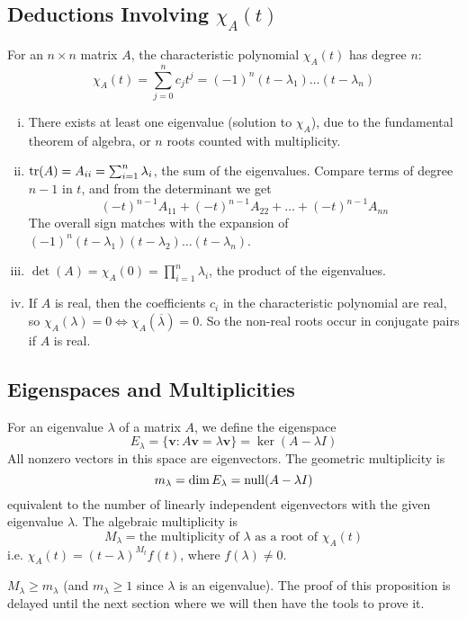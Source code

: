 \documentclass{article}
\begin{document}
\subsection{Deductions Involving $\chi_A(t)$}
For an $n \times n$ matrix $A$, the characteristic polynomial $\chi_A(t)$ has degree $n$:
\[ \chi_A(t) = \sum_{j = 0}^n c_j t^j = (-1)^n(t-\lambda_1)\dots(t-\lambda_n) \]
\begin{enumerate}[(i)]
	\item There exists at least one eigenvalue (solution to $\chi_A$), due to the fundamental theorem of algebra, or $n$ roots counted with multiplicity.
	\item $\tr(A) = A_{ii} = \sum_{i=1}^n \lambda_i$, the sum of the eigenvalues. Compare terms of degree $n-1$ in $t$, and from the determinant we get
	      \[ (-t)^{n-1}A_{11} + (-t)^{n-1}A_{22} + \dots + (-t)^{n-1}A_{nn} \]
	      The overall sign matches with the expansion of $(-1)^n(t-\lambda_1)(t-\lambda_2)\dots(t-\lambda_n)$.
	\item $\det(A) = \chi_A(0) = \prod_{i=1}^n \lambda_i$, the product of the eigenvalues.
	\item If $A$ is real, then the coefficients $c_i$ in the characteristic polynomial are real, so $\chi_A(\lambda) = 0 \iff \chi_A(\overline\lambda) = 0$. So the non-real roots occur in conjugate pairs if $A$ is real.
\end{enumerate}

\subsection{Eigenspaces and Multiplicities}
For an eigenvalue $\lambda$ of a matrix $A$, we define the eigenspace
\[ E_\lambda = \{ \bm v : A \bm v = \lambda \bm v \} = \ker (A - \lambda I) \]
All nonzero vectors in this space are eigenvectors. The geometric multiplicity is
\[ m_\lambda = \dim E_\lambda = \operatorname{null} (A - \lambda I) \]
equivalent to the number of linearly independent eigenvectors with the given eigenvalue $\lambda$. The algebraic multiplicity is
\[ M_\lambda = \text{the multiplicity of } \lambda \text{ as a root of } \chi_A(t) \]
i.e. $\chi_A(t) = (t - \lambda)^{M_t} f(t)$, where $f(\lambda) \neq 0$.

\begin{proposition}
	$M_\lambda \geq m_\lambda$ (and $m_\lambda \geq 1$ since $\lambda$ is an eigenvalue). The proof of this proposition is delayed until the next section where we will then have the tools to prove it.
\end{proposition}
\end{document}
